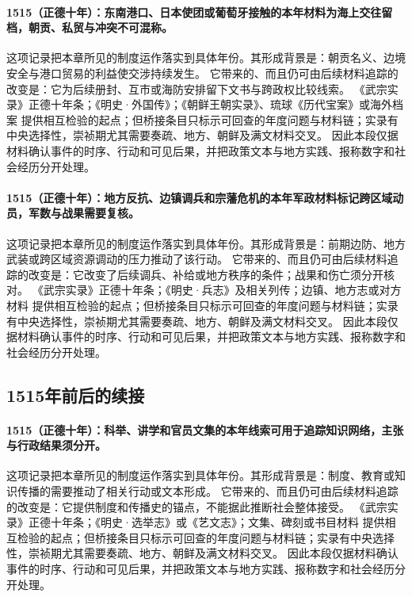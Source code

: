 \paragraph{1515（正德十年）：东南港口、日本使团或葡萄牙接触的本年材料为海上交往留档，朝贡、私贸与冲突不可混称。} 这项记录把本章所见的制度运作落实到具体年份。其形成背景是：朝贡名义、边境安全与港口贸易的利益使交涉持续发生。 它带来的、而且仍可由后续材料追踪的改变是：它为后续册封、互市或海防安排留下文书与跨政权比较线索。 《武宗实录》正德十年条；《明史·外国传》；《朝鲜王朝实录》、琉球《历代宝案》或海外档案 提供相互检验的起点；但桥接条目只标示可回查的年度问题与材料链；实录有中央选择性，崇祯期尤其需要奏疏、地方、朝鲜及满文材料交叉。 因此本段仅据材料确认事件的时序、行动和可见后果，并把政策文本与地方实践、报称数字和社会经历分开处理。

\paragraph{1515（正德十年）：地方反抗、边镇调兵和宗藩危机的本年军政材料标记跨区域动员，军数与战果需要复核。} 这项记录把本章所见的制度运作落实到具体年份。其形成背景是：前期边防、地方武装或跨区域资源调动的压力推动了该行动。 它带来的、而且仍可由后续材料追踪的改变是：它改变了后续调兵、补给或地方秩序的条件；战果和伤亡须分开核对。 《武宗实录》正德十年条；《明史·兵志》及相关列传；边镇、地方志或对方材料 提供相互检验的起点；但桥接条目只标示可回查的年度问题与材料链；实录有中央选择性，崇祯期尤其需要奏疏、地方、朝鲜及满文材料交叉。 因此本段仅据材料确认事件的时序、行动和可见后果，并把政策文本与地方实践、报称数字和社会经历分开处理。

\subsection{1515年前后的续接}

\paragraph{1515（正德十年）：科举、讲学和官员文集的本年线索可用于追踪知识网络，主张与行政结果须分开。} 这项记录把本章所见的制度运作落实到具体年份。其形成背景是：制度、教育或知识传播的需要推动了相关行动或文本形成。 它带来的、而且仍可由后续材料追踪的改变是：它提供制度和传播史的锚点，不能据此推断社会整体接受。 《武宗实录》正德十年条；《明史·选举志》或《艺文志》；文集、碑刻或书目材料 提供相互检验的起点；但桥接条目只标示可回查的年度问题与材料链；实录有中央选择性，崇祯期尤其需要奏疏、地方、朝鲜及满文材料交叉。 因此本段仅据材料确认事件的时序、行动和可见后果，并把政策文本与地方实践、报称数字和社会经历分开处理。

